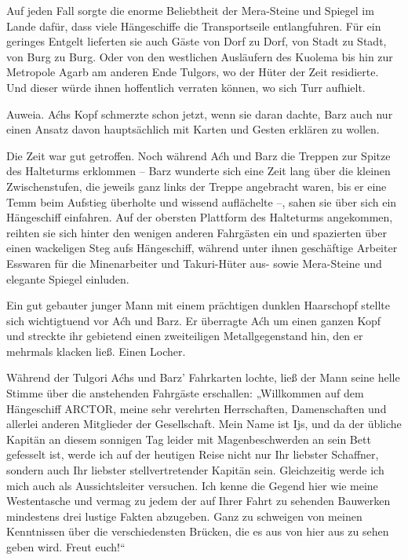 Auf jeden Fall sorgte die enorme Beliebtheit der Mera-Steine und Spiegel im Lande dafür, dass viele Hängeschiffe die Transportseile entlangfuhren. Für ein geringes Entgelt lieferten sie auch Gäste von Dorf zu Dorf, von Stadt zu Stadt, von Burg zu Burg. Oder von den westlichen Ausläufern des Kuolema bis hin zur Metropole Agarb am anderen Ende Tulgors, wo der Hüter der Zeit residierte. Und dieser würde ihnen hoffentlich verraten können, wo sich Turr aufhielt.

Auweia. Aćhs Kopf schmerzte schon jetzt, wenn sie daran dachte, Barz auch nur einen Ansatz davon hauptsächlich mit Karten und Gesten erklären zu wollen.



\trennzeichen



Die Zeit war gut getroffen. Noch während Aćh und Barz die Treppen zur Spitze des Halteturms erklommen – Barz wunderte sich eine Zeit lang über die kleinen Zwischenstufen, die jeweils ganz links der Treppe angebracht waren, bis er eine Temm beim Aufstieg überholte und wissend auflächelte –, sahen sie über sich ein Hängeschiff einfahren. Auf der obersten Plattform des Halteturms angekommen, reihten sie sich hinter den wenigen anderen Fahrgästen ein und spazierten über einen wackeligen Steg aufs Hängeschiff, während unter ihnen geschäftige Arbeiter Esswaren für die Minenarbeiter und Takuri-Hüter aus- sowie Mera-Steine und elegante Spiegel einluden.

Ein gut gebauter junger Mann mit einem prächtigen dunklen Haarschopf stellte sich wichtigtuend vor Aćh und Barz. Er überragte Aćh um einen ganzen Kopf und streckte ihr gebietend einen zweiteiligen Metallgegenstand hin, den er mehrmals klacken ließ. Einen Locher.

Während der Tulgori Aćhs und Barz’ Fahrkarten lochte, ließ der Mann seine helle Stimme über die anstehenden Fahrgäste erschallen: „Willkommen auf dem Hängeschiff ARCTOR, meine sehr verehrten Herrschaften, Damenschaften und allerlei anderen Mitglieder der Gesellschaft. Mein Name ist Ijs, und da der übliche Kapitän an diesem sonnigen Tag leider mit Magenbeschwerden an sein Bett gefesselt ist, werde ich auf der heutigen Reise nicht nur Ihr liebster Schaffner, sondern auch Ihr liebster stellvertretender Kapitän sein. Gleichzeitig werde ich mich auch als Aussichtsleiter versuchen. Ich kenne die Gegend hier wie meine Westentasche und vermag zu jedem der auf Ihrer Fahrt zu sehenden Bauwerken mindestens drei lustige Fakten abzugeben. Ganz zu schweigen von meinen Kenntnissen über die verschiedensten Brücken, die es aus von hier aus zu sehen geben wird. Freut euch!“

